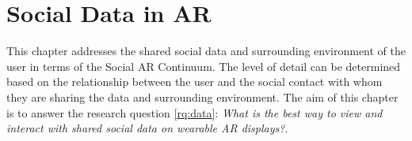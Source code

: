 \chapter{Social Data in AR} 
\label{ch:data} 


This chapter addresses the shared social data and surrounding environment of the user in terms of the Social AR Continuum. The level of detail can be determined based on the relationship between the user and the social contact with whom they are sharing the data and surrounding environment. The aim of this chapter is to answer the research question \ref{rq:data}: \textit{What is the best way to view and interact with shared social data on wearable AR displays?}. 




